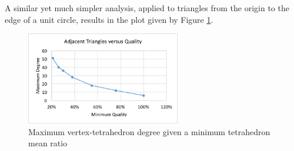 A similar yet much simpler analysis, applied to triangles
from the origin to the edge of a unit circle, results in the
plot given by Figure \ref{fig:max_tri_deg}.

\begin{figure}
\begin{center}
\includegraphics[width=0.6\textwidth]{max_tri_deg.png}
\caption{Maximum vertex-tetrahedron degree given a minimum tetrahedron mean ratio}
\label{fig:max_tri_deg}
\end{center}
\end{figure}
